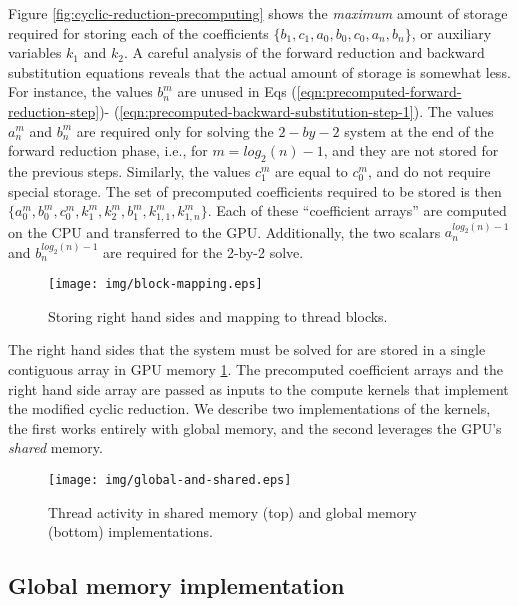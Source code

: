 Figure \ref{fig:cyclic-reduction-precomputing}
shows the
\emph{maximum} amount of storage required for
storing each of the coefficients
$\{b_1, c_1, a_0, b_0, c_0, a_n, b_n\}$,
or auxiliary variables $k_1$ and $k_2$.
A careful analysis of the
forward reduction and backward substitution equations
reveals that the actual amount of storage is somewhat less.
For instance,
the values $b_n^m$ are unused
in Eqs (\ref{eqn:precomputed-forward-reduction-step})-
(\ref{eqn:precomputed-backward-substitution-step-1}).
The values $a_n^m$ and $b_n^m$ are
required only for solving the $2-by-2$
system at the end of the forward reduction phase,
i.e., for $m=log_2(n)-1$,
and they are not stored for the previous steps.
Similarly, the values $c_1^m$ are equal to $c_0^m$,
and do not require special storage.
The set of precomputed coefficients required to be stored is then
$\{a_0^m, b_0^m, c_0^m, k_1^m, k_2^m, b_1^m, k_{1,1}^m, k_{1,n}^m\}$.
Each of these ``coefficient arrays'' are computed on the CPU
and transferred to the GPU.
Additionally, the two scalars $a_n^{log_2(n)-1}$ and $b_n^{log_2(n)-1}$
are required for the 2-by-2 solve.
%
\begin{figure}
\begin{center}
\texttt{[image: img/block-mapping.eps]}
\end{center}
\caption{Storing right hand sides and mapping to thread blocks.}
\label{fig:block-mapping}
\end{figure}
%
The right hand sides that the system must be solved for
are stored in a single contiguous array in GPU memory
\ref{fig:block-mapping}.
The precomputed coefficient arrays and the right hand side array
are passed as inputs to the compute kernels that implement
the modified cyclic reduction.
We describe two implementations of the kernels,
the first works entirely with global memory,
and the second leverages the GPU's \emph{shared} memory.

\begin{figure}
\begin{center}
\texttt{[image: img/global-and-shared.eps]}
\end{center}
\caption{Thread activity in shared memory (top) and global memory (bottom) implementations.}
\label{fig:global-and-shared}
\end{figure}

\subsection{Global memory implementation}

